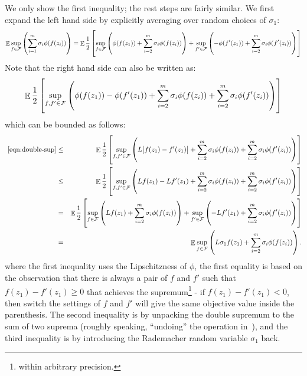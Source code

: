 \documentclass{article}
\newtheorem{theorem}{Theorem}
\DeclareMathOperator*{\Xcal}{{\cal X}}
\DeclareMathOperator*{\EE}{{\mathbb E}}
\newcommand{\RR}{\mathbb{R}} %
\newcommand{\Fcal}{\mathcal{F}}
\newcommand{\inner}[2]{\left\langle #1,#2 \right\rangle}
\begin{document}
We only show the first inequality; the rest steps are fairly similar. We first  expand the left hand side by explicitly averaging over random choices of $\sigma_1$:
\[ \EE \sup_{f \in \Fcal} \del{\sum_{i=1}^m \sigma_i \phi(f(z_i))}
 =
 \EE \frac12 \sbr{ \sup_{f \in \Fcal} \del{ \phi(f(z_1)) + \sum_{i=2}^m\sigma_i \phi(f(z_i))} + \sup_{f' \in \Fcal}\del{ -\phi(f'(z_1)) + \sum_{i=2}^m\sigma_i \phi(f'(z_i))}  }
\]
Note that the right hand side can also be written as:
\begin{equation}
\EE \frac12 \sbr{ \sup_{f, f' \in \Fcal} \del{ \phi(f(z_1)) - \phi(f'(z_1)) + \sum_{i=2}^m\sigma_i \phi(f(z_i)) + \sum_{i=2}^m\sigma_i \phi(f'(z_i))}}
\label{eqn:double-sup}
\end{equation}
which can be bounded as follows:
\begin{eqnarray*}
\text{~\eqref{eqn:double-sup}} &\leq&
\EE \frac12 \sbr{ \sup_{f, f' \in \Fcal} \del{ L\abs{f(z_1) - f'(z_1)} + \sum_{i=2}^m\sigma_i \phi(f(z_i)) + \sum_{i=2}^m\sigma_i \phi(f'(z_i))}} \\
&\leq&
\EE \frac12 \sbr{ \sup_{f, f' \in \Fcal} \del{ Lf(z_1) - Lf'(z_1) + \sum_{i=2}^m\sigma_i \phi(f(z_i)) + \sum_{i=2}^m\sigma_i \phi(f'(z_i))}} \\
&=&
\EE \frac12 \sbr{ \sup_{f \in \Fcal} \del{ Lf(z_1) + \sum_{i=2}^m\sigma_i \phi(f(z_i))} + \sup_{f' \in \Fcal}\del{ -Lf'(z_1) + \sum_{i=2}^m\sigma_i \phi(f'(z_i))}  } \\
&=&
\EE \sup_{f \in \Fcal} \del{L \sigma_1 f(z_1) + \sum_{i=2}^m \sigma_i \phi(f(z_i))}.
\end{eqnarray*}
where the first inequality uses the Lipschitzness of $\phi$, the first equality is based on the observation that there is always a pair of $f$ and $f'$ such that $f(z_1) - f'(z_1) \geq 0$ that achieves the supremum\footnote{within arbitrary precision.} - if $f(z_1) - f'(z_1) < 0$, then switch the settings of $f$ and $f'$ will give the same objective value inside the parenthesis. The second inequality is by unpacking the double supremum to the sum of two suprema (roughly speaking, ``undoing'' the operation in~\label{eqn:double-sup}), and the third inequality is by introducing the Rademacher random variable $\sigma_1$ back.



\end{document}

